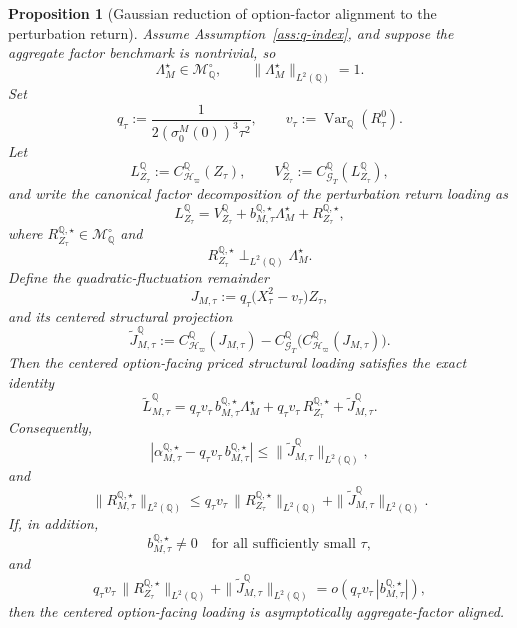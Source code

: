 \documentclass[11pt,a4paper]{amsart}
\theoremstyle{plain}
\newtheorem{proposition}[theorem]{Proposition}
\theoremstyle{definition}
\theoremstyle{remark}
\DeclareMathOperator{\Var}{Var}
\newcommand{\QQ}{\mathbb{Q}}
\newcommand{\cG}{\mathcal{G}}
\newcommand{\cH}{\mathcal{H}}
\newcommand{\cM}{\mathcal{M}}
\begin{document}
\begin{proposition}[Gaussian reduction of option-factor alignment to the perturbation return]\label{prop:gaussian-option-factor}
Assume Assumption~\ref{ass:q-index}, and suppose the aggregate factor benchmark is nontrivial, so
\[
        \Lambda_M^\star\in \cM_\QQ^\circ,
        \qquad
        \|\Lambda_M^\star\|_{L^2(\QQ)}=1.
\]
Set
\[
        q_\tau:=\frac{1}{2(\sigma_0^M(0))^3\tau^2},
        \qquad
        v_\tau:=\Var_\QQ(R_\tau^0).
\]
Let
\[
        L_{Z_\tau}^\QQ:=C_{\cH_\varpi}^\QQ(Z_\tau),
        \qquad
        V_{Z_\tau}^\QQ:=C_{\cG_T}^\QQ(L_{Z_\tau}^\QQ),
\]
and write the canonical factor decomposition of the perturbation return loading as
\[
        L_{Z_\tau}^\QQ
        =
        V_{Z_\tau}^\QQ
        +
        b_{M,\tau}^{\QQ,\star}\Lambda_M^\star
        +
        R_{Z_\tau}^{\QQ,\star},
\]
where \(R_{Z_\tau}^{\QQ,\star}\in \cM_\QQ^\circ\) and
\[
        R_{Z_\tau}^{\QQ,\star}\perp_{L^2(\QQ)}\Lambda_M^\star.
\]
Define the quadratic-fluctuation remainder
\[
        J_{M,\tau}
        :=
        q_\tau\bigl(X_\tau^2-v_\tau\bigr)Z_\tau,
\]
and its centered structural projection
\[
        \widetilde J_{M,\tau}^\QQ
        :=
        C_{\cH_\varpi}^\QQ(J_{M,\tau})
        -
        C_{\cG_T}^\QQ\bigl(C_{\cH_\varpi}^\QQ(J_{M,\tau})\bigr).
\]
Then the centered option-facing priced structural loading satisfies the exact identity
\[
        \widetilde L_{M,\tau}^\QQ
        =
        q_\tau v_\tau\,b_{M,\tau}^{\QQ,\star}\Lambda_M^\star
        +
        q_\tau v_\tau\,R_{Z_\tau}^{\QQ,\star}
        +
        \widetilde J_{M,\tau}^\QQ.
\]
Consequently,
\[
        \left|
                \alpha_{M,\tau}^{\QQ,\star}
                -
                q_\tau v_\tau\,b_{M,\tau}^{\QQ,\star}
        \right|
        \le
        \|\widetilde J_{M,\tau}^\QQ\|_{L^2(\QQ)},
\]
and
\[
        \|R_{M,\tau}^{\QQ,\star}\|_{L^2(\QQ)}
        \le
        q_\tau v_\tau\,\|R_{Z_\tau}^{\QQ,\star}\|_{L^2(\QQ)}
        +
        \|\widetilde J_{M,\tau}^\QQ\|_{L^2(\QQ)}.
\]
If, in addition,
\[
        b_{M,\tau}^{\QQ,\star}\neq0
        \quad\text{for all sufficiently small }\tau,
\]
and
\[
        q_\tau v_\tau\,\|R_{Z_\tau}^{\QQ,\star}\|_{L^2(\QQ)}
        +
        \|\widetilde J_{M,\tau}^\QQ\|_{L^2(\QQ)}
        =
        o\!\left(q_\tau v_\tau\,|b_{M,\tau}^{\QQ,\star}|\right),
\]
then the centered option-facing loading is asymptotically aggregate-factor aligned.
\end{proposition}
\end{document}
